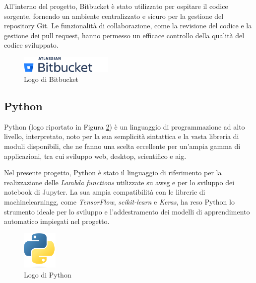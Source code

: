 All'interno del progetto, Bitbucket è stato utilizzato per ospitare il codice sorgente, fornendo un ambiente centralizzato e sicuro per la gestione del repository Git. Le funzionalità di collaborazione, come la revisione del codice e la gestione dei pull request, hanno permesso un efficace controllo della qualità del codice sviluppato.

\begin{figure}[h]
  \centering
  \includegraphics[width=0.4\textwidth]{img/tecnologie/bitbucket.png}
  \caption{Logo di Bitbucket}
  \label{fig:bitbucket}
\end{figure}

\subsection{Python}

Python (logo riportato in Figura \ref{fig:python}) è un linguaggio di programmazione ad alto livello, interpretato, noto per la sua semplicità sintattica e la vasta libreria di moduli disponibili, che ne fanno una scelta eccellente per un'ampia gamma di applicazioni, tra cui sviluppo web, desktop, scientifico e \gls{aig}.

Nel presente progetto, Python è stato il linguaggio di riferimento per la realizzazione delle \textit{Lambda functions} utilizzate su \gls{awsg} e per lo sviluppo dei notebook di Jupyter. La sua ampia compatibilità con le librerie di \gls{machinelearningg}, come \textit{TensorFlow}, \textit{scikit-learn} e \textit{Keras}, ha reso Python lo strumento ideale per lo sviluppo e l'addestramento dei modelli di apprendimento automatico impiegati nel progetto.

\begin{figure}[h]
  \centering
  \includegraphics[width=0.15\textwidth]{img/tecnologie/python.png}
  \caption{Logo di Python}
  \label{fig:python}
\end{figure}
